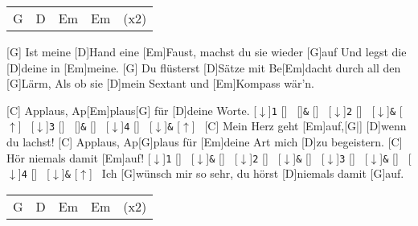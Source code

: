 



\begin{guitar}
	{\footnotesize\begin{tabular}{l|l|l|l l}
			G & D & Em & Em & (x2)
	\end{tabular}}
	
	[G] Ist meine [D]Hand eine [Em]Faust, machst du sie wieder [G]auf
	Und legst die [D]deine in [Em]meine.
	[G] Du flüsterst [D]Sätze mit Be[Em]dacht durch all den [G]Lärm,
	Als ob sie [D]mein Sextant und [Em]Kompass wär'n.
	
	[C] Applaus, Ap[Em]plaus[G] für [D]deine Worte.\hspace*{\fill}%
		[$\downarrow$]{{\footnotesize\texttt{1}}}%
		[]{{\footnotesize\texttt{~}}}%
		[]{{\footnotesize\texttt{\&}}}%
		[]{{\footnotesize\texttt{~}}}%
		[$\downarrow$]{{\footnotesize\texttt{2}}}%
		[]{{\footnotesize\texttt{~}}}%
		[$\downarrow$]{{\footnotesize\texttt{\&}}}%
		[$\uparrow$]{{\footnotesize\texttt{~}}}%
		[$\downarrow$]{{\footnotesize\texttt{3}}}%
		[]{{\footnotesize\texttt{~}}}%
		[]{{\footnotesize\texttt{\&}}}%
		[]{{\footnotesize\texttt{~}}}%
		[$\downarrow$]{{\footnotesize\texttt{4}}}%
		[]{{\footnotesize\texttt{~}}}%
		[$\downarrow$]{{\footnotesize\texttt{\&}}}%
		[$\uparrow$]{{\footnotesize\texttt{~}}}
	[C] Mein Herz geht [Em]auf,[G|] [D]wenn du lachst!
	[C] Applaus, Ap[G]plaus für [Em]deine Art mich [D]zu begeistern.
	[C] Hör niemals damit [Em]auf!\hspace*{\fill}%
		[$\downarrow$]{{\footnotesize\texttt{1}}}%
		[]{{\footnotesize\texttt{~}}}%
		[$\downarrow$]{{\footnotesize\texttt{\&}}}%
		[]{{\footnotesize\texttt{~}}}%
		[$\downarrow$]{{\footnotesize\texttt{2}}}%
		[]{{\footnotesize\texttt{~}}}%
		[$\downarrow$]{{\footnotesize\texttt{\&}}}%
		[]{{\footnotesize\texttt{~}}}%
		[$\downarrow$]{{\footnotesize\texttt{3}}}%
		[]{{\footnotesize\texttt{~}}}%
		[$\downarrow$]{{\footnotesize\texttt{\&}}}%
		[]{{\footnotesize\texttt{~}}}%
		[$\downarrow$]{{\footnotesize\texttt{4}}}%
		[]{{\footnotesize\texttt{~}}}%
		[$\downarrow$]{{\footnotesize\texttt{\&}}}%
		[$\uparrow$]{{\footnotesize\texttt{~}}}
	Ich [G]wünsch mir so sehr, du hörst [D]niemals damit [G]auf.
	
	{\footnotesize\begin{tabular}{l|l|l|l l}
			G & D & Em & Em & (x2)
	\end{tabular}}
	

\end{guitar}
